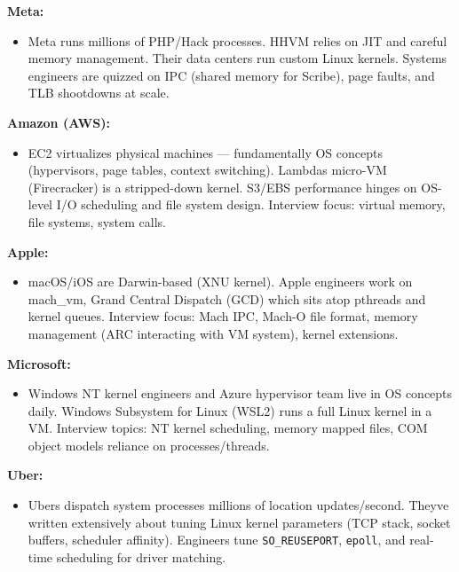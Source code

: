 \documentclass[11pt]{article}
\providecommand{\tightlist}{\setlength{\itemsep}{1pt}\setlength{\parskip}{0pt}}
\begin{document}
\textbf{Meta:}

\begin{itemize}
\tightlist
\item
  Meta runs millions of PHP/Hack processes. HHVM relies on JIT and careful memory management. Their data centers run custom Linux kernels. Systems engineers are quizzed on IPC (shared memory for Scribe), page faults, and TLB shootdowns at scale.
\end{itemize}

\textbf{Amazon (AWS):}

\begin{itemize}
\tightlist
\item
  EC2 virtualizes physical machines --- fundamentally OS concepts (hypervisors, page tables, context switching). Lambda\textquotesingle s micro-VM (Firecracker) is a stripped-down kernel. S3/EBS performance hinges on OS-level I/O scheduling and file system design. Interview focus: virtual memory, file systems, system calls.
\end{itemize}

\textbf{Apple:}

\begin{itemize}
\tightlist
\item
  macOS/iOS are Darwin-based (XNU kernel). Apple engineers work on mach\_vm, Grand Central Dispatch (GCD) which sits atop pthreads and kernel queues. Interview focus: Mach IPC, Mach-O file format, memory management (ARC interacting with VM system), kernel extensions.
\end{itemize}

\textbf{Microsoft:}

\begin{itemize}
\tightlist
\item
  Windows NT kernel engineers and Azure hypervisor team live in OS concepts daily. Windows Subsystem for Linux (WSL2) runs a full Linux kernel in a VM. Interview topics: NT kernel scheduling, memory mapped files, COM object model\textquotesingle s reliance on processes/threads.
\end{itemize}

\textbf{Uber:}

\begin{itemize}
\tightlist
\item
  Uber\textquotesingle s dispatch system processes millions of location updates/second. They\textquotesingle ve written extensively about tuning Linux kernel parameters (TCP stack, socket buffers, scheduler affinity). Engineers tune \texttt{SO\_REUSEPORT}, \texttt{epoll}, and real-time scheduling for driver matching.
\end{itemize}
\end{document}
